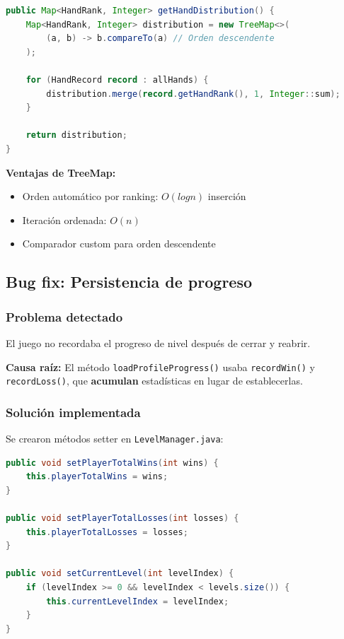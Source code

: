 \documentclass[12pt,a4paper]{article}
\begin{document}
\begin{lstlisting}[language=Java, caption=TreeMap con orden personalizado]
public Map<HandRank, Integer> getHandDistribution() {
    Map<HandRank, Integer> distribution = new TreeMap<>(
        (a, b) -> b.compareTo(a) // Orden descendente
    );
    
    for (HandRecord record : allHands) {
        distribution.merge(record.getHandRank(), 1, Integer::sum);
    }
    
    return distribution;
}
\end{lstlisting}

\textbf{Ventajas de TreeMap:}
\begin{itemize}
    \item Orden automático por ranking: $O(log n)$ inserción
    \item Iteración ordenada: $O(n)$
    \item Comparador custom para orden descendente
\end{itemize}

\subsection{Bug fix: Persistencia de progreso}

\subsubsection{Problema detectado}

El juego no recordaba el progreso de nivel después de cerrar y reabrir.

\textbf{Causa raíz:} El método \texttt{loadProfileProgress()} usaba \texttt{recordWin()} y \texttt{recordLoss()}, que \textbf{acumulan} estadísticas en lugar de establecerlas.

\subsubsection{Solución implementada}

Se crearon métodos setter en \texttt{LevelManager.java}:

\begin{lstlisting}[language=Java, caption=Setters para restaurar estado]
public void setPlayerTotalWins(int wins) {
    this.playerTotalWins = wins;
}

public void setPlayerTotalLosses(int losses) {
    this.playerTotalLosses = losses;
}

public void setCurrentLevel(int levelIndex) {
    if (levelIndex >= 0 && levelIndex < levels.size()) {
        this.currentLevelIndex = levelIndex;
    }
}
\end{lstlisting}
\end{document}
